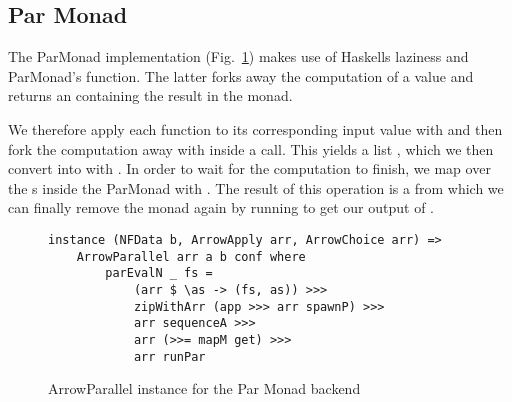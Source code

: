 \subsection{Par Monad}
The ParMonad implementation (Fig.~\ref{fig:ArrowParallelParMonad}) makes use of Haskells laziness and ParMonad's  function. The latter forks away the computation of a value and returns an  containing the result in the  monad.


We therefore apply each function to its corresponding input value with  and then fork the computation away with  inside a  call. This yields a list , which we then convert into  with . In order to wait for the computation to finish, we map over the s inside the ParMonad with . The result of this operation is a  from which we can finally remove the monad again by running  to get our output of \code{[b]}.
\begin{figure}[h]
\begin{lstlisting}[frame=htrbl]
instance (NFData b, ArrowApply arr, ArrowChoice arr) =>
	ArrowParallel arr a b conf where
		parEvalN _ fs = 
			(arr $ \as -> (fs, as)) >>>
			zipWithArr (app >>> arr spawnP) >>>
			arr sequenceA >>>
			arr (>>= mapM get) >>>
			arr runPar
\end{lstlisting} %
\caption{ArrowParallel instance for the Par Monad backend}
\label{fig:ArrowParallelParMonad}
\end{figure}

